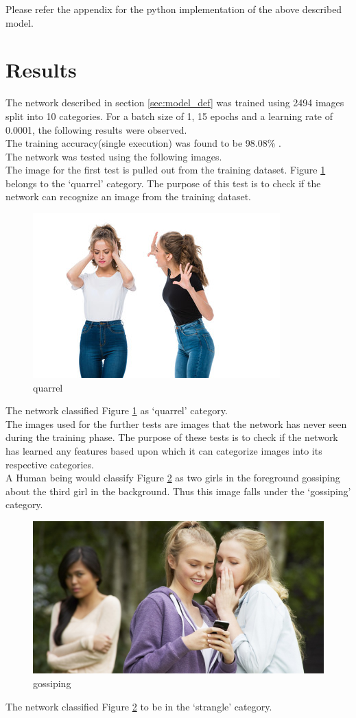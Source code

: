 \documentclass[12pt]{article}
\begin{document}
Please refer the appendix for the python implementation of the above described model. 
\newpage

\section{Results}
The network described in section \ref{sec:model_def} was trained using 2494 images split into 10 categories. For a batch size of 1, 15 epochs and a learning rate of 0.0001, the following results were observed. \\

\noindent
The training accuracy(single execution) was found to be 98.08\% . \\

\noindent
The network was tested using the following images. \\

\noindent
The image for the first test is pulled out from the training dataset. Figure \ref{fig:quarrel} belongs to the \lq{quarrel}\rq{} category. The purpose of this test is to check if the network can recognize an image from the training dataset. 
\begin{figure}[H]
\centering
  \includegraphics[width=.4\linewidth]{./Images/quarrel.jpg}
  \caption{quarrel}
  \label{fig:quarrel}
\end{figure}
The network classified Figure \ref{fig:quarrel} as \lq{quarrel}\rq{} category. \\

\noindent
The images used for the further tests are images that the network has never seen during the training phase. The purpose of these tests is to check if the network has learned any features based upon which it can categorize images into its respective categories. \\

A Human being would classify Figure \ref{fig:gossip1} as two girls in the foreground gossiping about the third girl in the background. Thus this image falls under the \lq{gossiping}\rq{} category. 
\begin{figure}[H]
\centering
  \includegraphics[width=.4\linewidth]{./Images/gossiping1.jpg}
  \caption{gossiping}
  \label{fig:gossip1}
\end{figure}
The network classified Figure \ref{fig:gossip1} to be in the  \lq{strangle}\rq{} category. \\
\end{document}
